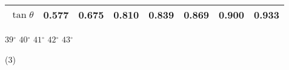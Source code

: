 \begin{QUESTIONS}
\begin{QUESTION}
\begin{QBODY}
\begin{tabular}{|c|c|c|c|c|c|c|c|}
			$\tan \theta $	& 0.577	        &    0.675	    &       0.810	    &     0.839	       &   0.869	   &       0.900	&      0.933     \\\hline
			\end{tabular}
			\begin{QOPS}
				\QOP $39{}^\circ $
				\QOP $40{}^\circ $
				\QOP $41{}^\circ $
				\QOP $42{}^\circ $
				\QOP $43{}^\circ $
			\end{QOPS}
        \end{QBODY}
        \begin{QFROMS}
        \end{QFROMS}
        \begin{QTAGS}\end{QTAGS}
        \begin{QANS}
            (3)
        \end{QANS}
        \begin{QSOLLIST}
        \end{QSOLLIST}
        \begin{QEMPTYSPACE}
        \end{QEMPTYSPACE}
    \end{QUESTION}
\end{QUESTIONS}
